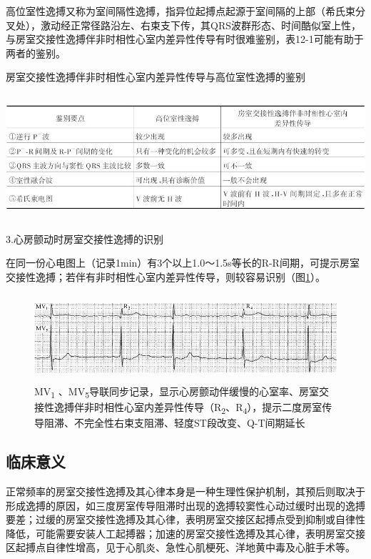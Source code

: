 高位室性逸搏又称为室间隔性逸搏，指异位起搏点起源于室间隔的上部（希氏束分叉处），激动经正常径路沿左、右束支下传，其QRS波群形态、时间酷似室上性，与房室交接性逸搏伴非时相性心室内差异性传导有时很难鉴别，表12-1可能有助于两者的鉴别。

\begin{table}[htbp]
\centering
\caption{房室交接性逸搏伴非时相性心室内差异性传导与高位室性逸搏的鉴别}
\label{tab12-1}
\includegraphics[width=6.22917in,height=1.8125in]{./images/Image00203.jpg}
\end{table}

3.心房颤动时房室交接性逸搏的识别

在同一份心电图上（记录1min）有3个以上1.0～1.5s等长的R-R间期，可提示房室交接性逸搏；若伴有非时相性心室内差异性传导，则较容易识别（图\ref{fig12-10}）。

\begin{figure}[!htbp]
 \centering
 \includegraphics[width=5.58333in,height=1.27083in]{./images/Image00204.jpg}
 \captionsetup{justification=centering}
 \caption{MV\textsubscript{1} 、MV\textsubscript{5}导联同步记录，显示心房颤动伴缓慢的心室率、房室交接性逸搏伴非时相性心室内差异性传导（R\textsubscript{2}、R\textsubscript{4}），提示二度房室传导阻滞、不完全性右束支阻滞、轻度ST段改变、Q-T间期延长}
 \label{fig12-10}
  \end{figure} 


\protect\hypertarget{text00019.htmlux5cux23subid185}{}{}

\subsection{临床意义}

正常频率的房室交接性逸搏及其心律本身是一种生理性保护机制，其预后则取决于形成逸搏的原因，如三度房室传导阻滞时出现的逸搏较窦性心动过缓时出现的逸搏要差；过缓的房室交接性逸搏及其心律，表明房室交接区起搏点受到抑制或自律性降低，可能需要安装人工起搏器；加速的房室交接性逸搏及其心律，表明房室交接区起搏点自律性增高，见于心肌炎、急性心肌梗死、洋地黄中毒及心脏手术等。

